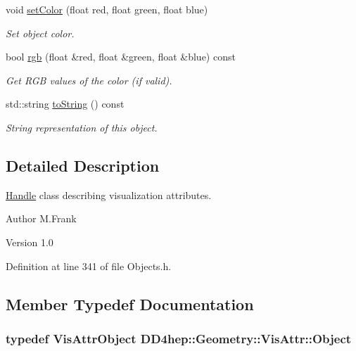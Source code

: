 \begin{DoxyCompactItemize}
void \hyperlink{class_d_d4hep_1_1_geometry_1_1_vis_attr_aa9f0dec964e94cbb6df397e242ac57b5}{setColor} (float red, float green, float blue)
\begin{DoxyCompactList}\small\item\em Set object color. \item\end{DoxyCompactList}\item 
bool \hyperlink{class_d_d4hep_1_1_geometry_1_1_vis_attr_a8480e8b84abfc922aff11be462dd3746}{rgb} (float \&red, float \&green, float \&blue) const 
\begin{DoxyCompactList}\small\item\em Get RGB values of the color (if valid). \item\end{DoxyCompactList}\item 
std::string \hyperlink{class_d_d4hep_1_1_geometry_1_1_vis_attr_a020d26d02871cee31c187d749f90d308}{toString} () const 
\begin{DoxyCompactList}\small\item\em String representation of this object. \item\end{DoxyCompactList}\end{DoxyCompactItemize}


\subsection{Detailed Description}
\hyperlink{class_d_d4hep_1_1_handle}{Handle} class describing visualization attributes. \begin{DoxyAuthor}{Author}
M.Frank 
\end{DoxyAuthor}
\begin{DoxyVersion}{Version}
1.0 
\end{DoxyVersion}


Definition at line 341 of file Objects.h.

\subsection{Member Typedef Documentation}
\hypertarget{class_d_d4hep_1_1_geometry_1_1_vis_attr_a8c2a1708a4161f27aed36d464be316cc}{
\subsubsection[{Object}]{\setlength{\rightskip}{0pt plus 5cm}typedef {\bf VisAttrObject} {\bf DD4hep::Geometry::VisAttr::Object}}}
\label{class_d_d4hep_1_1_geometry_1_1_vis_attr_a8c2a1708a4161f27aed36d464be316cc}


